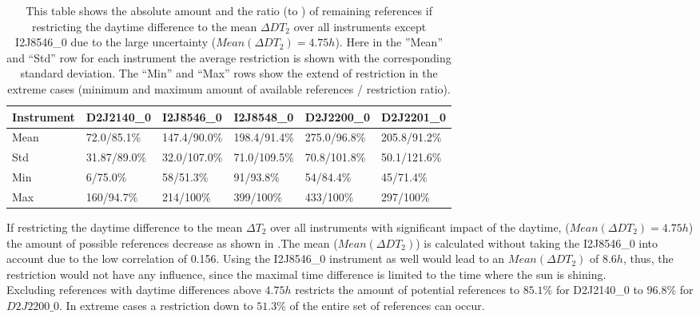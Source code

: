 	\begin{table}
	\centering
		\begin{tabular}{|p{1.8cm}|p{2.15cm}|p{2.15cm}|p{2.15cm}|p{2.15cm}|p{2.15cm}|}
		Instrument	&D2J2140\_0&I2J8546\_0& I2J8548\_0&D2J2200\_0&D2J2201\_0\\
		\toprule
		Mean&
		72.0/85.1\% &		147.4/90.0\%&
		198.4/91.4\%&		275.0/96.8\%&
		205.8/91.2\%\\
		\midrule
		Std&		31.87/89.0\%&32.0/107.0\%&
		71.0/109.5\%&		70.8/101.8\%&
		50.1/121.6\% \\
		\midrule
		Min&
		6/75.0\%&		58/51.3\%
		&91/93.8\%		&54/84.4\%
		&45/71.4\%\\
		\midrule
		Max&
		160/94.7\% &
		214/100\% &
		399/100\% &
		433/100\% &
		297/100\% \\
		\bottomrule
	\end{tabular}
	\caption{This table shows the absolute amount and the ratio (to ) of remaining references if restricting the daytime difference to the mean $\Delta DT_{2}$ over all instruments except I2J8546\_0 due to the large uncertainty ($Mean(\Delta DT_{2}) = 4.75h$). Here in the ”Mean” and “Std” row for each  instrument the average restriction is shown with the corresponding standard deviation. The “Min” and “Max” rows show the extend of restriction in the extreme cases (minimum and maximum amount of available references / restriction ratio).}
	\label{tab:daytimerest}
\end{table}	
If restricting the daytime difference to the mean $\Delta T_{2}$ over all instruments with significant impact of the daytime, ($Mean(\Delta DT_{2}) = 4.75h$) the amount of possible references decrease as shown in .The mean ($Mean(\Delta DT_{2})$) is calculated without taking the I2J8546\_0 into account due to the low correlation of 0.156. Using the I2J8546\_0 instrument as well would lead to an  $Mean(\Delta DT_{2})$ of $8.6h$, thus, the restriction would not have any influence, since the maximal time difference is limited to the time where the sun is shining.\\ 
Excluding references with daytime differences above $4.75h$ restricts the amount of potential references to $85.1\%$ for D2J2140\_0 to $96.8\%$ for $ D2J2200\_0$. In extreme cases a restriction down to $51.3\%$ of the entire set of references can occur.
	
